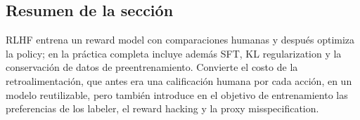 
\subsection{Resumen de la sección}

RLHF entrena un reward model con comparaciones humanas y después optimiza la policy; en la práctica completa incluye además SFT, KL regularization y la conservación de datos de preentrenamiento. Convierte el costo de la retroalimentación, que antes era una calificación humana por cada acción, en un modelo reutilizable, pero también introduce en el objetivo de entrenamiento las preferencias de los labeler, el reward hacking y la proxy misspecification.
